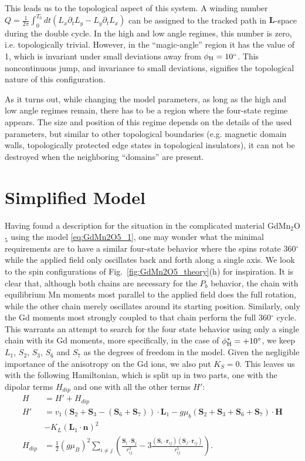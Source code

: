 This leads us to the topological aspect of this system. A winding number $Q=\frac{1}{2\pi}\int_0^{T_0} dt (L_x\partial_t L_y - L_y \partial_t L_x)$ can be assigned to the tracked path in $\mathbf{L}$-space during the double cycle.
In the high and low angle regimes, this number is zero, i.e. topologically trivial. However, in the ``magic-angle'' region it has the value of 1, which is invariant under small deviations away from $\phi_{\rm H} = 10^\circ$. This noncontinuous jump, and invariance to small deviations, signifies the topological nature of this configuration.

As it turns out, while changing the model parameters, as long as the high and low angle regimes remain, there has to be a region where the four-state regime appears. The size and position of this regime depends on the details of the used parameters, but similar to other topological boundaries (e.g. magnetic domain walls, topologically protected edge states in topological insulators), it can not be destroyed when the neighboring ``domains'' are present.

\section{Simplified Model}
Having found a description for the situation in the complicated material GdMn$_2$O$_5$ using the model \ref{eq:GdMn2O5_1}, one may wonder what the minimal requirements are to have a similar four-state behavior where the spins rotate 360$^\circ$ while the applied field only oscillates back and forth along a single axis.
We look to the spin configurations of Fig.~\ref{fig:GdMn2O5_theory}(h) for inspiration.
It is clear that, although both chains are necessary for the $P_b$ behavior, the chain with equilibrium Mn moments most parallel to the applied field does the full rotation, while the other chain merely oscillates around its starting position.
Similarly, only the Gd moments most strongly coupled to that chain perform the full 360$^\circ$ cycle.
This warrants an attempt to search for the four state behavior using only a single chain with its Gd moments, more specifically, in the case of $\phi_{\rm H}^\ast = +10^\circ$, we keep $L_1$, $S_2$, $S_3$, $S_6$ and $S_7$ as the degrees of freedom in the model.
Given the negligible importance of the anisotropy on the Gd ions, we also put $K_S = 0$.
This leaves us with the following Hamiltonian, which is split up in two parts, one with the dipolar terms $H_{dip}$ and one with all the other terms $H'$:
\begin{align}
	H &= H' + H_{dip} \\
	H' &= v_1(\mathbf{S}_2 + \mathbf{S}_3 - (\mathbf{S}_6 + \mathbf{S}_7))\cdot\mathbf{L}_1 - g \mu_b (\mathbf{S}_2 + \mathbf{S}_3 + \mathbf{S}_6 + \mathbf{S}_7) \cdot \mathbf{H} \\
	&- K_L (\mathbf{L}_1 \cdot \mathbf{n})^2 \\
	H_{dip} &= \frac{1}{2}(g \mu_B)^2\sum_{i\neq j}\left(\frac{\mathbf{S}_i\cdot \mathbf{S}_j}{r_{ij}^3}-3\frac{(\mathbf{S}_i\cdot \mathbf{r}_{ij})(\mathbf{S}_j\cdot \mathbf{r}_{ij})}{r_{ij}^5}\right).
\end{align}


